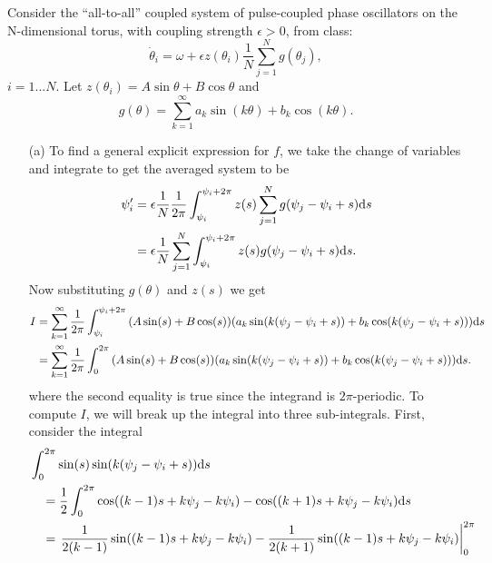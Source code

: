 \documentclass[12pt]{report}
\begin{document}
\begin{solution}
    
    \noindent
    Consider the ``all-to-all'' coupled system of pulse-coupled phase oscillators on the N-dimensional torus, with coupling strength $\epsilon>0$, from class:
    \begin{equation}
    \dot \theta_i = \omega + \epsilon z(\theta_i) \frac{1}{N} \sum_{j=1}^N g(\theta_j),
    \end{equation}
    $i=1...N$. Let $z(\theta_i)=A \sin \theta + B \cos \theta $ and
    \[
        g(\theta) = \sum_{k=1}^\infty a_k \sin(k \theta) + b_k \cos(k \theta).
    \]

    \begin{enumerate}
        \item [(a)]
        To find a general explicit expression for $f$, we take the change of variables and integrate to get the averaged system to be
        \begin{align*}
            \psi_i' &= {\epsilon} \frac{1}{N} \frac{1}{2\pi} \int_{\psi_i}^{\psi_i + 2\pi}z(s)\sum_{j=1}^{N}g(\psi_j - \psi_i + s){\mathrm{d}} s\\
            &= {\epsilon} \frac{1}{N}\sum_{j=1}^{N} \int_{\psi_i}^{\psi_i + 2\pi}z(s)g(\psi_j - \psi_i + s){\mathrm{d}} s.
        \end{align*}
        Now substituting $g(\theta)$ and $z(s)$ we get
        \begin{align*}
            I &= \sum_{k=1}^{\infty} \frac{1}{2\pi}\int_{\psi_i}^{\psi_i + 2\pi} {\left(A\sin(s) + B\cos(s)\right)}{\left(a_k\sin(k(\psi_j - \psi_i + s)) + b_k\cos(k(\psi_j - \psi_i + s))\right)}{\mathrm{d}} s\\
            &=\sum_{k=1}^{\infty} \frac{1}{2\pi}\int_{0}^{2\pi} {\left(A\sin(s) + B\cos(s)\right)}{\left(a_k\sin(k(\psi_j - \psi_i + s)) + b_k\cos(k(\psi_j - \psi_i + s))\right)}{\mathrm{d}} s.
        \end{align*}
        where the second equality is true since the integrand is $2\pi$-periodic. To compute $I$, we will break up the integral into three sub-integrals. First, consider the integral
        \begin{align*}
            &\int_0^{2\pi} \sin(s)\sin(k(\psi_j - \psi_i + s))\d s\\
            &\quad = \frac{1}{2}\int_0^{2\pi} \cos((k-1)s + k \psi_j - k\psi_i) - \cos((k+1)s + k \psi_j - k\psi_i)\d s\\
            &\quad = \left. \frac{1}{2(k-1)}\sin((k-1)s + k\psi_j - k\psi_i) - \frac{1}{2(k+1)}\sin((k-1)s + k\psi_j - k\psi_i) \right|_0^{2\pi}\\

\end{align*}
\end{enumerate}
\end{solution}
\end{document}
